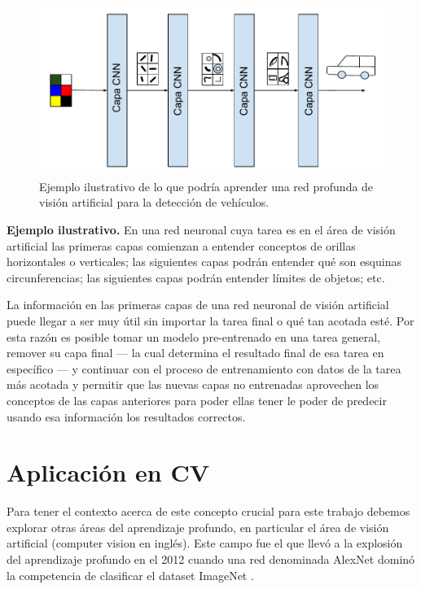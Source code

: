 \begin{figure}
\includegraphics[scale=1]{Figures/learnbylayer.pdf}
\caption{Ejemplo ilustrativo de lo que podría aprender una red profunda de visión artificial para la detección de vehículos.}
\label{fig:learnbylayer}
\end{figure}

\textbf{Ejemplo ilustrativo.} En una red neuronal cuya tarea es en el área de visión artificial las primeras capas comienzan a entender conceptos de orillas horizontales o verticales; las siguientes capas podrán entender qué son esquinas circunferencias; las siguientes capas podrán entender límites de objetos; etc.

La información en las primeras capas de una red neuronal de visión artificial puede llegar a ser muy útil sin importar la tarea final o qué tan acotada esté. Por esta razón es posible tomar un modelo pre-entrenado en una tarea general, remover su capa final --- la cual determina el resultado final de esa tarea en específico --- y continuar con el proceso de entrenamiento con datos de la tarea más acotada y permitir que las nuevas capas no entrenadas aprovechen los conceptos de las capas anteriores para poder ellas tener le poder de predecir usando esa información los resultados correctos.



\section{Aplicación en CV}
Para tener el contexto acerca de este concepto crucial para este trabajo debemos explorar otras áreas del aprendizaje profundo, en particular el área de visión artificial (computer vision en inglés). Este campo fue el que llevó a la explosión del aprendizaje profundo en el 2012 cuando una red denominada AlexNet dominó la competencia de clasificar el dataset ImageNet \parencite{deng2009imagenet}.

